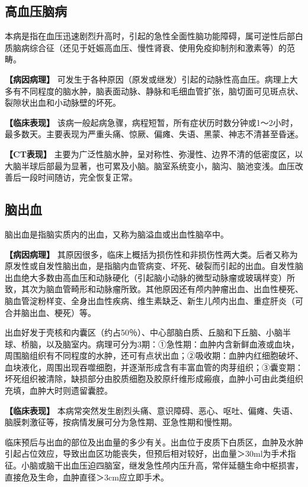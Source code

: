 \subsection{高血压脑病}

本病是指在血压迅速剧烈升高时，引起的急性全面性脑功能障碍，属可逆性后部白质脑病综合征（还见于妊娠高血压、慢性肾衰、使用免疫抑制剂和激素等）的范畴。

\textbf{【病因病理】}
可发生于各种原因（原发或继发）引起的动脉性高血压。病理上大多有不同程度的脑水肿，脑表面动脉、静脉和毛细血管扩张，脑切面可见斑点状、裂隙状出血和小动脉壁的坏死。

\textbf{【临床表现】}
该病一般起病急骤，病程短暂，所有症状历时数分钟或1～2小时，最多数天。主要表现为严重头痛、惊厥、偏瘫、失语、黑蒙、神志不清甚至昏迷。

\textbf{【CT表现】}
主要为广泛性脑水肿，呈对称性、弥漫性、边界不清的低密度区，以大脑半球后部最为显著，也可累及小脑。脑室系统变小，脑沟、脑池变浅。血压改善后一段时间随访，完全恢复正常。

\subsection{脑出血}

脑出血是指脑实质内的出血，又称为脑溢血或出血性脑卒中。

\textbf{【病因病理】}
其原因很多，临床上概括为损伤性和非损伤性两大类。后者又称为原发性或自发性脑出血，是指脑内血管病变、坏死、破裂而引起的出血。自发性脑出血绝大多数由高血压和动脉硬化（引起脑小动脉的微型动脉瘤或玻璃样变）所致，其次为脑血管畸形和动脉瘤所致。其他原因还有颅内肿瘤出血、出血性梗死、脑血管淀粉样变、全身出血性疾病、维生素缺乏、新生儿颅内出血、重症肝炎（可合并脑出血、梗死）等。

出血好发于壳核和内囊区（约占50％）、中心部脑白质、丘脑和下丘脑、小脑半球、桥脑，以及脑室内。病理可分为3期：①急性期：血肿内含新鲜血液或血块，周围脑组织有不同程度的水肿，还可有点状出血；②吸收期：血肿内红细胞破坏、血块液化，周围出现吞噬细胞，并逐渐形成含有丰富血管的肉芽组织；③囊变期：坏死组织被清除，缺损部分由胶质细胞及胶原纤维形成瘢痕，血肿小可由此类组织充填，血肿大时则遗留囊腔。

\textbf{【临床表现】}
本病常突然发生剧烈头痛、意识障碍、恶心、呕吐、偏瘫、失语、脑膜刺激征等，按病情发展可分为急性期、亚急性期和慢性期。

临床预后与出血的部位及出血量的多少有关。出血位于皮质下白质区，血肿及水肿引起占位效应，导致出血区功能丧失，但预后相对较好，出血量＞30ml为手术指征。小脑或脑干出血压迫四脑室，继发急性颅内压升高，常伴延髓生命中枢损害，直接危及生命，血肿直径＞3cm应立即手术。

